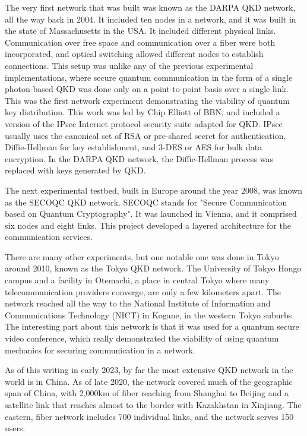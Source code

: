 The very first network that was built was known as the DARPA QKD network, all the way back in 2004. It included ten nodes in a network, and it was built in the state of Massachusetts in the USA. It included different physical links. Communication over free space and communication over a fiber were both incorporated, and optical switching allowed different nodes to establish connections. This setup was unlike any of the previous experimental implementations, where secure quantum communication in the form of a single photon-based QKD was done only on a point-to-point basis over a single link. This was the first network experiment demonstrating the viability of quantum key distribution.  This work was led by Chip Elliott of BBN, and included a version of the IPsec Internet protocol security suite adapted for QKD.  IPsec usually uses the canonical set of RSA or pre-shared secret for authentication, Diffie-Hellman for key establishment, and 3-DES or AES for bulk data encryption.  In the DARPA QKD network, the Diffie-Hellman process was replaced with keys generated by QKD.

The next experimental testbed, built in Europe around the year 2008, was known as the SECOQC QKD network. SECOQC stands for "Secure Communication based on Quantum Cryptography". It was launched in Vienna, and it comprised six nodes and eight links. This project developed a layered architecture for the communication services.

There are many other experiments, but one notable one was done in Tokyo around 2010, known as the Tokyo QKD network. The University of Tokyo Hongo campus and a facility in Otemachi, a place in central Tokyo where many telecommunication providers converge, are only a few kilometers apart.  The network reached all the way to the National Institute of Information and Communications Technology (NICT) in Kogane, in the western Tokyo suburbs. The interesting part about this network is that it was used for a quantum secure video conference, which really demonstrated the viability of using quantum mechanics for securing communication in a network.

As of this writing in early 2023, by far the most extensive QKD network in the world is in China.  As of late 2020, the network covered much of the geographic span of China, with 2,000km of fiber reaching from Shanghai to Beijing and a satellite link that reaches almost to the border with Kazakhstan in Xinjiang. The eastern, fiber network includes 700 individual links, and the network serves 150 users.

